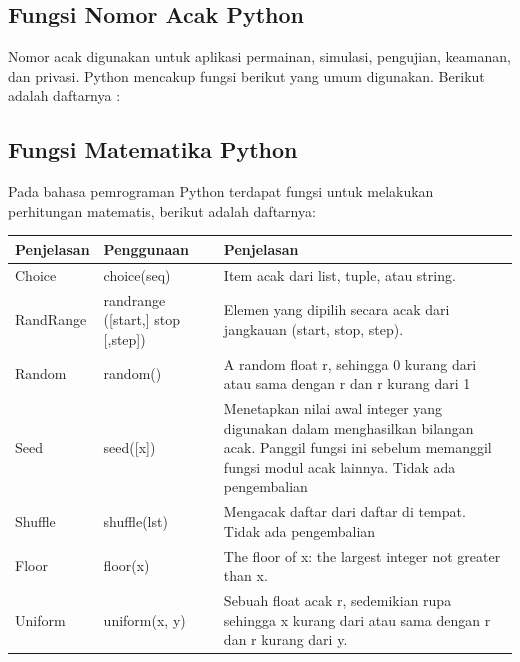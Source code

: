 \subsection{Fungsi Nomor Acak Python}
Nomor acak digunakan untuk aplikasi permainan, simulasi, pengujian, keamanan, dan privasi. Python mencakup fungsi berikut yang umum digunakan. Berikut adalah daftarnya :
\subsection{Fungsi Matematika Python}
Pada bahasa pemrograman Python terdapat fungsi untuk melakukan perhitungan matematis, berikut adalah daftarnya:
\begin{center}
\begin{tabular}{ | m{2cm} | m{2cm} | m{5cm} | }
\hline
Penjelasan & Penggunaan & Penjelasan \\
\hline
Choice & choice(seq) & Item acak dari list, tuple, atau string. \\
\hline
RandRange & randrange ([start,] stop [,step]) & Elemen yang dipilih secara acak dari jangkauan (start, stop, step). \\
\hline
Random & random() & A random float r, sehingga 0 kurang dari atau sama dengan r dan r kurang dari 1 \\
\hline
Seed & seed([x]) & Menetapkan nilai awal integer yang digunakan dalam menghasilkan bilangan acak. Panggil fungsi ini sebelum memanggil fungsi modul acak lainnya. Tidak ada pengembalian \\
\hline
Shuffle & shuffle(lst) & Mengacak daftar dari daftar di tempat. Tidak ada pengembalian \\
\hline
Floor & floor(x) & The floor of x: the largest integer not greater than x. \\
\hline
Uniform & uniform(x, y) & Sebuah float acak r, sedemikian rupa sehingga x kurang dari atau sama dengan r dan r kurang dari y. \\
\hline
\end{tabular}
\end{center}

